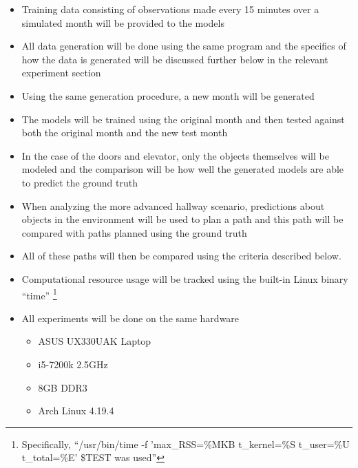   \begin{itemize}

    \item Training data consisting of observations made every 15 minutes over
          a simulated month will be provided to the models

    \item All data generation will be done using the same program and the
          specifics of how the data is generated will be discussed further
          below in the relevant experiment section

    \item Using the same generation procedure, a new month will be generated

    \item The models will be trained using the original month and then tested
          against both the original month and the new test month

    \item In the case of the doors and elevator, only the objects themselves
          will be modeled and the comparison will be how well the generated
          models are able to predict the ground truth

    \item When analyzing the more advanced hallway scenario, predictions about
          objects in the environment will be used to plan a path and this path
          will be compared with paths planned using the ground truth

    \item All of these paths will then be compared using the criteria described
          below.

    \item Computational resource usage will be tracked using the built-in Linux
      binary ``time'' \footnote[1]{Specifically, ``/usr/bin/time -f 'max\_RSS=\%MKB t\_kernel=\%S t\_user=\%U t\_total=\%E' \$TEST was used''}


    \item All experiments will be done on the same hardware
      \begin{itemize}
        \item ASUS UX330UAK Laptop
        \item i5-7200k 2.5GHz
        \item 8GB DDR3
        \item Arch Linux 4.19.4
      \end{itemize}

  \end{itemize}

